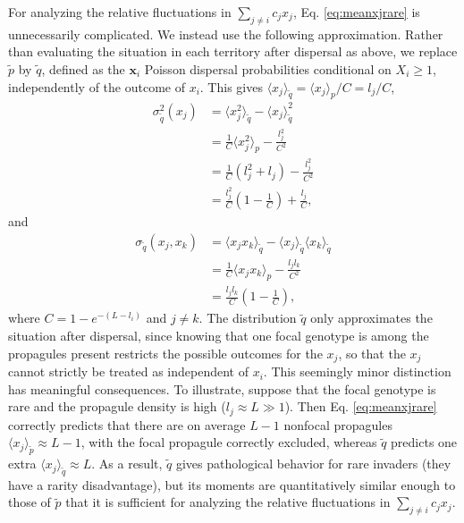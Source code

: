 \documentclass[11pt]{article}
\begin{document}
For analyzing the relative fluctuations in $\sum_{j\neq i} c_j x_j$, Eq. \eqref{eq:meanxjrare} is unnecessarily complicated. We instead use the following approximation. Rather than evaluating the situation in each territory after dispersal as above, we replace $\tilde{p}$ by $\tilde{q}$, defined as the ${\mathbf x_i}$ Poisson dispersal probabilities conditional on $X_i\geq1$, independently of the outcome of $x_i$. This gives $\langle x_j \rangle_{\tilde{q}}=\langle x_j \rangle_p/C=l_j/C$, 
\begin{align}
\sigma_{\tilde{q}}^2(x_j)&=\langle x_j^2 \rangle_{\tilde{q}}-\langle x_j \rangle_{\tilde{q}}^2\nonumber\\
&=\frac{1}{C}\langle x_j^2 \rangle_p-\frac{l_j^2}{C^2}\nonumber \\
&=\frac{1}{C}(l_j^2 + l_j)-\frac{l_j^2}{C^2}\nonumber \\
&=\frac{l_j^2}{C}\left(1-\frac{1}{C}\right)+\frac{l_j}{C},\label{eq:varr}
\end{align}
and 
\begin{align}
\sigma_{\tilde{q}}(x_j,x_k)&=\langle x_j x_k \rangle_{\tilde{q}}-\langle x_j \rangle_{\tilde{q}}\langle x_k \rangle_{\tilde{q}}\nonumber\\
&=\frac{1}{C}\langle x_j x_k \rangle_p-\frac{l_jl_k}{C^2}\nonumber\\
&=\frac{l_j l_k}{C}\left(1-\frac{1}{C}\right),\label{eq:covr}
\end{align}
where $C=1-e^{-(L-l_i)}$ and $j\neq k$. The distribution $\tilde{q}$ only approximates the situation after dispersal, since knowing that one focal genotype is among the propagules present restricts the possible outcomes for the $x_j$, so that the $x_j$ cannot strictly be treated as independent of $x_i$. This seemingly minor distinction has meaningful consequences. To illustrate, suppose that the focal genotype is rare and the propagule density is high ($l_j \approx L\gg 1$). Then Eq. \eqref{eq:meanxjrare} correctly predicts that there are on average $L-1$ nonfocal propagules $\langle x_j \rangle_{\tilde{p}}\approx L-1$, with the focal propagule correctly excluded, whereas $\tilde{q}$ predicts one extra $\langle x_j \rangle_{\tilde{q}}\approx L$. As a result, $\tilde{q}$ gives pathological behavior for rare invaders (they have a rarity disadvantage), but its moments are quantitatively similar enough to those of $\tilde{p}$ that it is sufficient for analyzing the relative fluctuations in $\sum_{j\neq i} c_j x_j$.
\end{document}
